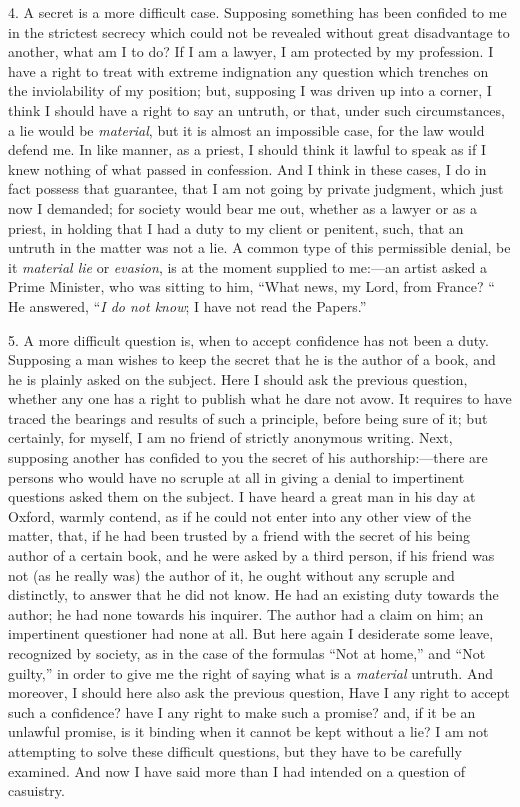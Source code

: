 4. A secret is a more difficult case. Supposing something has been
confided to me in the strictest secrecy which could not be revealed
without great disadvantage to another, what am I to do? If I am a
lawyer, I am protected by my profession. I have a right to treat with
extreme indignation any question which trenches on the inviolability of
my position; but, supposing I was driven up into a corner, I think I
should have a right to say an untruth, or that, under such
circumstances, a lie would be \emph{material}, but it is almost an
impossible case, for the law would defend me. In like manner, as a
priest, I should think it lawful to speak as if I knew nothing of what
passed in confession. And I think in these cases, I do in fact possess
that guarantee, that I am not going by private judgment, which just now
I demanded; for society would bear me out, whether as a lawyer or as a
priest, in holding that I had a duty to my client or penitent,
such, that an untruth in the matter was not a lie. A common type of this
permissible denial, be it \emph{material lie} or \emph{evasion}, is at
the moment supplied to me:—an artist asked a Prime Minister,
who was sitting to him, ``What news, my Lord, from France? `` He
answered, ``\emph{I do not know}; I have not read the Papers.''

5. A more difficult question is, when to accept confidence has not
been a duty. Supposing a man wishes to keep the secret that he is the
author of a book, and he is plainly asked on the subject. Here I should
ask the previous question, whether any one has a right to publish what
he dare not avow. It requires to have traced the bearings and results of
such a principle, before being sure of it; but certainly, for myself, I
am no friend of strictly anonymous writing. Next, supposing another has
confided to you the secret of his authorship:—there are
persons who would have no scruple at all in giving a denial to
impertinent questions asked them on the subject. I have heard a great
man in his day at Oxford, warmly contend, as if he could not enter into
any other view of the matter, that, if he had been trusted by a friend
with the secret of his being author of a certain book, and he were asked
by a third person, if his friend was not (as he really was) the author
of it, he ought without any scruple and distinctly, to answer that he did
not know. He had an existing duty towards the author; he had none
towards his inquirer. The author had a claim on him; an impertinent
questioner had none at all. But here again I desiderate some leave,
recognized by society, as in the case of the formulas ``Not at home,'' and
``Not guilty,'' in order to give me the right of saying what is
a \emph{material} untruth. And moreover, I should here also ask the
previous question, Have I any right to accept such a confidence? have I
any right to make such a promise? and, if it be an unlawful
promise, is it binding when it cannot be kept without a lie? I am not
attempting to solve these difficult questions, but they have to be
carefully examined. And now I have said more than I had intended on
a question of casuistry.


